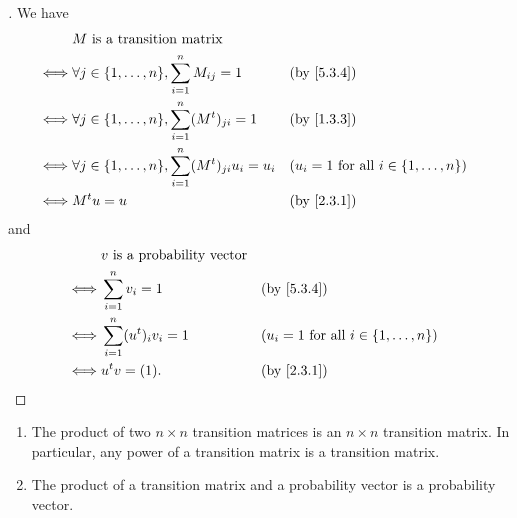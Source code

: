 \begin{proof}[]
  We have
  \begin{align*}
         & M \text{ is a transition matrix}                                                                                                 \\
    \iff & \forall j \in \set{1, \dots, n}, \sum_{i = 1}^n M_{i j} = 1              &  & \by{5.3.4}                                         \\
    \iff & \forall j \in \set{1, \dots, n}, \sum_{i = 1}^n (\tp{M})_{j i} = 1       &  & \by{1.3.3}                                         \\
    \iff & \forall j \in \set{1, \dots, n}, \sum_{i = 1}^n (\tp{M})_{j i} u_i = u_i &  & (u_i = 1 \text{ for all } i \in \set{1, \dots, n}) \\
    \iff & \tp{M} u = u                                                             &  & \by{2.3.1}
  \end{align*}
  and
  \begin{align*}
         & v \text{ is a probability vector}                                                         \\
    \iff & \sum_{i = 1}^n v_i = 1            &  & \by{5.3.4}                                         \\
    \iff & \sum_{i = 1}^n (\tp{u})_i v_i = 1 &  & (u_i = 1 \text{ for all } i \in \set{1, \dots, n}) \\
    \iff & \tp{u} v = (1).                   &  & \by{2.3.1}
  \end{align*}
\end{proof}

\begin{cor}\label{5.3.5}
  \begin{enumerate}
    \item The product of two \(n \times n\) transition matrices is an \(n \times n\) transition matrix.
          In particular, any power of a transition matrix is a transition matrix.
    \item The product of a transition matrix and a probability vector is a probability vector.
  \end{enumerate}
\end{cor}


